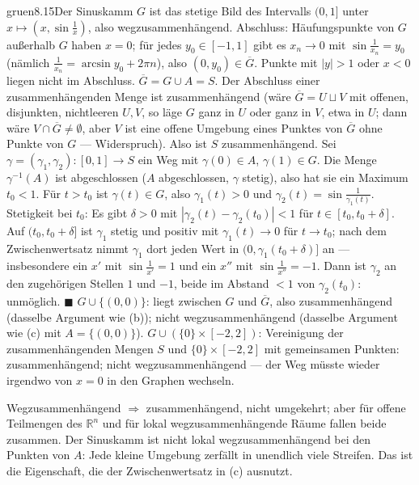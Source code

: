 \begin{loesungkarte}{gruen}{8.15}{Der Sinuskamm}
$G$ ist das stetige Bild des Intervalls $(0, 1]$ unter $x\mapsto(x, \sin\frac1x)$, also wegzusammenhängend. Abschluss: Häufungspunkte von $G$ außerhalb $G$ haben $x = 0$; für jedes $y_0\in[-1, 1]$ gibt es $x_n\to0$ mit $\sin\frac1{x_n} = y_0$ (nämlich $\frac1{x_n} = \arcsin y_0 + 2\pi n$), also $(0, y_0)\in\overline G$. Punkte mit $|y| > 1$ oder $x < 0$ liegen nicht im Abschluss. $\overline G = G\cup A = S$. \checkmark
{}
Der Abschluss einer zusammenhängenden Menge ist zusammenhängend (wäre $\overline G = U\sqcup V$ mit offenen, disjunkten, nichtleeren $U, V$, so läge $G$ ganz in $U$ oder ganz in $V$, etwa in $U$; dann wäre $V\cap\overline G\neq\emptyset$, aber $V$ ist eine offene Umgebung eines Punktes von $\overline G$ ohne Punkte von $G$ --- Widerspruch). Also ist $S$ zusammenhängend.
Sei $\gamma = (\gamma_1, \gamma_2)\colon[0, 1]\to S$ ein Weg mit $\gamma(0)\in A$, $\gamma(1)\in G$. Die Menge $\gamma^{-1}(A)$ ist abgeschlossen ($A$ abgeschlossen, $\gamma$ stetig), also hat sie ein Maximum $t_0 < 1$. Für $t > t_0$ ist $\gamma(t)\in G$, also $\gamma_1(t) > 0$ und $\gamma_2(t) = \sin\frac1{\gamma_1(t)}$. Stetigkeit bei $t_0$: Es gibt $\delta > 0$ mit $|\gamma_2(t) - \gamma_2(t_0)| < 1$ für $t\in[t_0, t_0 + \delta]$. Auf $(t_0, t_0 + \delta]$ ist $\gamma_1$ stetig und positiv mit $\gamma_1(t)\to0$ für $t\to t_0$; nach dem Zwischenwertsatz nimmt $\gamma_1$ dort jeden Wert in $(0, \gamma_1(t_0 + \delta)]$ an --- insbesondere ein $x'$ mit $\sin\frac1{x'} = 1$ und ein $x''$ mit $\sin\frac1{x''} = -1$. Dann ist $\gamma_2$ an den zugehörigen Stellen $1$ und $-1$, beide im Abstand $< 1$ von $\gamma_2(t_0)$: unmöglich. $\blacksquare$
$G\cup\{(0, 0)\}$: liegt zwischen $G$ und $\overline G$, also zusammenhängend (dasselbe Argument wie (b)); nicht wegzusammenhängend (dasselbe Argument wie (c) mit $A = \{(0, 0)\}$). $G\cup(\{0\}\times[-2, 2])$: Vereinigung der zusammenhängenden Mengen $S$ und $\{0\}\times[-2, 2]$ mit gemeinsamen Punkten: zusammenhängend; nicht wegzusammenhängend --- der Weg müsste wieder irgendwo von $x = 0$ in den Graphen wechseln.
\begin{mitnehmen}\kastentext
Wegzusammenhängend $\Rightarrow$ zusammenhängend, nicht umgekehrt; aber für offene Teilmengen des $\mathbb R^{n}$ und für lokal wegzusammenhängende Räume fallen beide zusammen. Der Sinuskamm ist nicht lokal wegzusammenhängend bei den Punkten von $A$: Jede kleine Umgebung zerfällt in unendlich viele Streifen. Das ist die Eigenschaft, die der Zwischenwertsatz in (c) ausnutzt.
\end{mitnehmen}
\end{loesungkarte}

